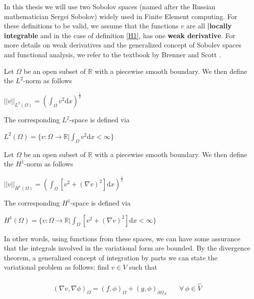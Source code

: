 In this thesis we will use two Sobolov spaces (named after the Russian mathematician Sergei Sobolov) widely used in Finite Element computing. For these definitions to be valid, we assume that the functions $v$ are all \textbf{|locally integrable} and in the case of definition \eqref{H1}, has one \textbf{weak derivative}. For more details on weak derivatives and the generalized concept of Sobolev spaces and functional analysis, we refer to the textbook by Brenner and Scott \cite{Bren07}.   
\begin{definition}
Let $\Omega$ be an open subset of $\mathbb{R}$ with a piecewise smooth boundary. We then define the $L^2$-norm as follows\\ \begin{center}
$||v||_{L^2(\Omega)} = (\int_\Omega v^2 \mathrm{d}x)^{\frac{1}{2}}$
\end{center}
The corresponding $L^2$-space is defined via
\begin{center}
$L^2(\Omega) = \{ v:\Omega \rightarrow \mathbb{R} | \int_\Omega v^2 \mathrm{d}x < \infty \}$
\end{center}
\label{|l2}
\end{definition}
\begin{definition}
Let $\Omega$ be an open subset of $\mathbb{R}$ with a piecewise smooth boundary. We then define the $H^1$-norm as follows\\ \begin{center}
$||v||_{H^1(\Omega)} = (\int_\Omega [v^2 + (\nabla v)^2]\mathrm{d}x)^{\frac{1}{2}}$
\end{center}
The corresponding $H^1$-space is defined via
\begin{center} $H^1(\Omega) = \{ v:\Omega \rightarrow \mathbb{R} | \int_\Omega [v^2 + (\nabla v)^2] \mathrm{d}x < \infty \}$
\end{center}
\label{H1}
\end{definition}
In other words, using functions from these spaces, we can have some assurance that the integrals involved in the variational form are bounded. 
By the divergence theorem, a generalized concept of integration by parts we can state the variational problem as follows: find $v \in V$ such that \\ \\
\begin{align}
(\nabla v, \nabla \phi)_\Omega = (f,\phi)_\Omega + (g, \phi)_{\partial \Omega_N}& \quad \forall \, \phi \in \hat{V} \label{Weak_form}
\end{align}
\\
